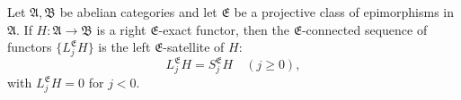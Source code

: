 Let $\mathfrak{A}, \mathfrak{B}$ be abelian categories and let $\mathfrak{E}$ be a projective class of epimorphisms in $\mathfrak{A}$. If $H : \mathfrak{A} \rightarrow \mathfrak{B}$ is a right $\mathfrak{E}$-exact functor, then the $\mathfrak{E}$-connected sequence of functors $\{L_j^{\mathfrak{E}} H\}$ is the left $\mathfrak{E}$-satellite of $H$:
$$L_j^{\mathfrak{E}} H = S_j^{\mathfrak{E}} H \quad (j \geq 0),$$
with $L_j^{\mathfrak{E}} H = 0$ for $j < 0$.
